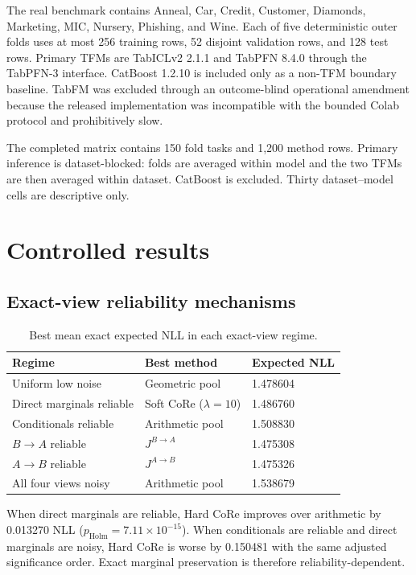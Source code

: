 \documentclass[pdflatex,sn-basic]{sn-jnl}
\newcommand{\Jone}{J^{B\rightarrow A}}
\newcommand{\Jtwo}{J^{A\rightarrow B}}
\theoremstyle{plain}
\begin{document}
The real benchmark contains Anneal, Car, Credit, Customer, Diamonds, Marketing, MIC, Nursery, Phishing, and Wine. Each of five deterministic outer folds uses at most 256 training rows, 52 disjoint validation rows, and 128 test rows. Primary TFMs are TabICLv2 2.1.1 and TabPFN 8.4.0 through the TabPFN-3 interface. CatBoost 1.2.10 is included only as a non-TFM boundary baseline. TabFM was excluded through an outcome-blind operational amendment because the released implementation was incompatible with the bounded Colab protocol and prohibitively slow.

The completed matrix contains 150 fold tasks and 1,200 method rows. Primary inference is dataset-blocked: folds are averaged within model and the two TFMs are then averaged within dataset. CatBoost is excluded. Thirty dataset--model cells are descriptive only.

\section{Controlled results}\label{sec:controlled}
\subsection{Exact-view reliability mechanisms}
\begin{table}[t]
\caption{Best mean exact expected NLL in each exact-view regime.}
\centering
\begin{tabular}{lll}
\toprule
Regime & Best method & Expected NLL\\
\midrule
Uniform low noise & Geometric pool & 1.478604\\
Direct marginals reliable & Soft CoRe ($\lambda=10$) & 1.486760\\
Conditionals reliable & Arithmetic pool & 1.508830\\
$B\rightarrow A$ reliable & $\Jone$ & 1.475308\\
$A\rightarrow B$ reliable & $\Jtwo$ & 1.475326\\
All four views noisy & Arithmetic pool & 1.538679\\
\bottomrule
\end{tabular}
\end{table}

When direct marginals are reliable, Hard CoRe improves over arithmetic by 0.013270 NLL ($p_{\mathrm{Holm}}=7.11\times10^{-15}$). When conditionals are reliable and direct marginals are noisy, Hard CoRe is worse by 0.150481 with the same adjusted significance order. Exact marginal preservation is therefore reliability-dependent.
\end{document}
